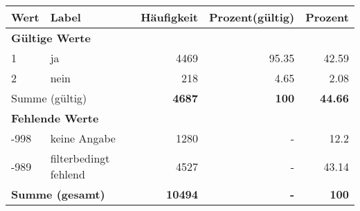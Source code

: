      \begin{longtable}{lXrrr}
     \toprule
     \textbf{Wert} & \textbf{Label} & \textbf{Häufigkeit} & \textbf{Prozent(gültig)} & \textbf{Prozent} \\
     \endhead
     \midrule
     \multicolumn{5}{l}{\textbf{Gültige Werte}}\\

     1 &
     \multicolumn{1}{X}{ ja   } &


       \num{4469} &
       \num[round-mode=places,round-precision=2]{95.35} &
         \num[round-mode=places,round-precision=2]{42.59} \\

     2 &
     \multicolumn{1}{X}{ nein   } &


       \num{218} &
       \num[round-mode=places,round-precision=2]{4.65} &
         \num[round-mode=places,round-precision=2]{2.08} \\
     \midrule
     \multicolumn{2}{l}{Summe (gültig)} &
       \textbf{\num{4687}} &
     \textbf{\num{100}} &
       \textbf{\num[round-mode=places,round-precision=2]{44.66}} \\
     \multicolumn{5}{l}{\textbf{Fehlende Werte}}\\
       -998 &
       keine Angabe &
         \num{1280} &
        - &
         \num[round-mode=places,round-precision=2]{12.2} \\
       -989 &
       filterbedingt fehlend &
         \num{4527} &
        - &
         \num[round-mode=places,round-precision=2]{43.14} \\
     \midrule
     \multicolumn{2}{l}{\textbf{Summe (gesamt)}} &
          \textbf{\num{10494}} &
        \textbf{-} &
        \textbf{\num{100}} \\
     \bottomrule
     \end{longtable}
     
